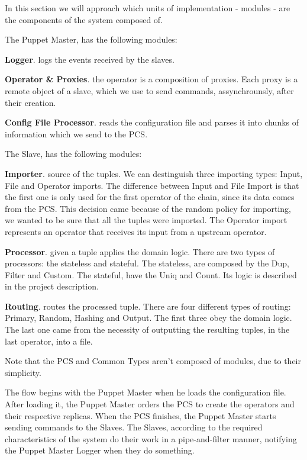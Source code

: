 \documentclass[times, 10pt,twocolumn]{article}
\begin{document}
In this section we will approach which units of implementation - modules - are the components of the system composed of.

The Puppet Master, has the following modules: 

\textbf{Logger}. logs the events received by the slaves.

\textbf{Operator \& Proxies}. the operator is a composition of proxies. Each proxy is a remote object of a slave, which we use to send commands, assynchrounsly, after their creation.

\textbf{Config File Processor}. reads the configuration file and parses it into chunks of information which we send to the PCS.

The Slave, has the following modules:

\textbf{Importer}. source of the tuples. We can destinguish three importing types: Input, File and Operator imports. The difference between Input and File Import is that the first one is only used for the first operator of the chain, since its data comes from the PCS. This decision came because of the random policy for importing, we wanted to be sure that all the tuples were imported. The Operator import represents an operator that receives its input from a upstream operator.

\textbf{Processor}. given a tuple applies the domain logic. There are two types of processors: the stateless and stateful. The stateless, are composed by the Dup, Filter and Custom. The stateful, have the Uniq and Count. Its logic is described in the project description.

\textbf{Routing}. routes the processed tuple. There are four different types of routing: Primary, Random, Hashing and Output. The first three obey the domain logic. The last one came from the necessity of outputting the resulting tuples, in the last operator, into a file. 

Note that the PCS and Common Types aren't composed of modules, due to their simplicity.



The flow begins with the Puppet Master when he loads the configuration file. After loading it, the Puppet Master orders the PCS to create the operators and their respective replicas. When the PCS finishes, the Puppet Master starts sending commands to the Slaves. The Slaves, according to the required characteristics of the system do their work in a pipe-and-filter manner, notifying the Puppet Master Logger when they do something.
\end{document}
